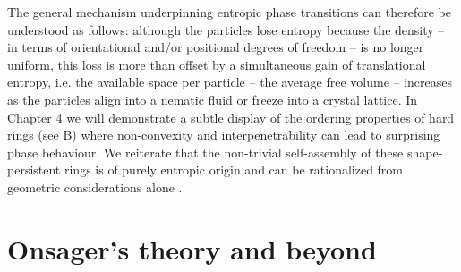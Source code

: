\documentclass[amssymb]{revtex4}
\begin{document}
The general mechanism underpinning  entropic phase transitions can therefore be understood as follows:
although the particles lose entropy because the density -- in terms of orientational and/or positional degrees of freedom --
is no longer uniform, this loss is more than offset by a simultaneous gain of translational
entropy, i.e.  the available space per particle -- the average free volume -- increases as the particles align into a nematic fluid or freeze into
a crystal lattice. 
In Chapter 4 we will demonstrate a subtle display of the ordering properties of hard rings (see B) where non-convexity and interpenetrability can lead to surprising phase behaviour.  We reiterate that  the non-trivial self-assembly of these shape-persistent rings \cite{avendano2016} is of purely entropic origin and can be rationalized from geometric considerations alone \cite{wensink_avendano2016}. 


\section{Onsager's theory and beyond}
\end{document}
